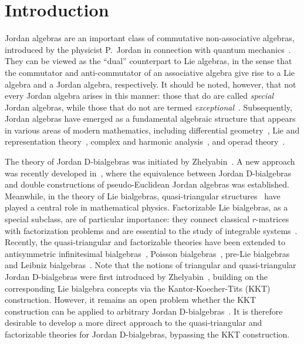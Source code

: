 \documentclass[12pt, reqno, a4paper]{amsart}
\theoremstyle{definition}
\begin{document}
\section{Introduction}
Jordan algebras are an important class of commutative non-associative algebras, introduced by the physicist P.~Jordan in connection with quantum mechanics~\cite{jordan1932klasse, jordan1934algebraic}.
They can be viewed as the ``dual'' counterpart to Lie algebras, in the sense that the commutator and anti-commutator of an associative algebra give rise to a Lie algebra and a Jordan algebra, respectively.
It should be noted, however, that not every Jordan algebra arises in this manner: those that do are called \emph{special} Jordan algebras, while those that do not are termed \emph{exceptional}~\cite{albert1947structure, jacobson1968structure}.
Subsequently, Jordan algebras have emerged as a fundamental algebraic structure that appears in various areas of modern mathematics, including differential geometry~\cite{chu2006grassmann, chu2008jordan,  iorduanescu2000jordan, kocher1970jordan}, Lie and representation theory~\cite{bertram2002geometry, koecher1967imbedding, kostant1993jordan, meyberg1970jordan}, complex and harmonic analysis~\cite{kaup2000symmetric, resnikoff1975theta, upmeier1986jordan, upmeier2011symmetric}, and operad theory~\cite{ bagherzadeh2017trialgebras, bai2013splitting, kashuba2021free}.   

The theory of Jordan D-bialgebras was initiated by Zhelyabin~\cite{zhelyabin1997jordan,zhelyabin2000class}.
A new approach was recently developed in~\cite{hou2022new}, where the equivalence between Jordan D-bialgebras and double constructions of pseudo-Euclidean Jordan algebras was established. 
Meanwhile, in the theory of Lie bialgebras, quasi-triangular structures~\cite{drinfeld1986quantum} have played a central role in mathematical physics. 
Factorizable Lie bialgebras, as a special subclass, are of particular importance: they connect classical $r$-matrices with factorization problems and are essential to the study of integrable systems~\cite{bai2010nonabelian, reshetikhin1988quantum,semenov2003integrable}.
Recently, the quasi-triangular and factorizable theories have been extended to antisymmetric infinitesimal bialgebras~\cite{sheng2023quasi}, Poisson bialgebras~\cite{lin2026quasitriangular}, pre-Lie bialgebras~\cite{wang2024quasi} and Leibniz bialgebras~\cite{bai2024quasi}.
Note that the notions of triangular and quasi-triangular Jordan D-bialgebras were first introduced by Zhelyabin~\cite{zhelyabin1999finite}, building on the corresponding Lie bialgebra concepts via the Kantor-Koecher-Tits (KKT) construction. 
However, it remains an open problem whether the KKT construction can be applied to arbitrary Jordan D-bialgebras~\cite{zhelyabin1997jordan, zhelyabin1998jordan}. 
It is therefore desirable to develop a more direct approach to the quasi-triangular and factorizable theories for Jordan D-bialgebras, bypassing the KKT construction.
\end{document}
